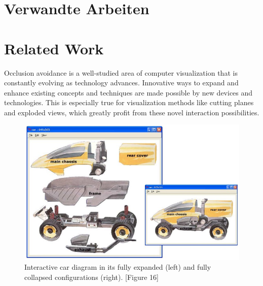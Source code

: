 {\chapter{Verwandte Arbeiten}}
{\chapter{Related Work}}
\label{sec:related}




Occlusion avoidance is a well-studied area of computer visualization that is constantly evolving as technology advances.
Innovative ways to expand and enhance existing concepts and techniques are made possible by new devices and technologies. 
This is especially true for visualization methods like cutting planes and exploded views, which greatly profit from these novel interaction possibilities.
\begin{figure}
	\begin{center}
		\vspace{-0.7cm}
		\includegraphics[width=1\linewidth]{fig/Images/Li_ExplodedView_GI04_fig16}
	\end{center}
	\caption[]{Interactive car diagram in its fully expanded (left) and fully collapsed configurations (right). \cite{li2004interactive} [Figure 16]}
\end{figure}

